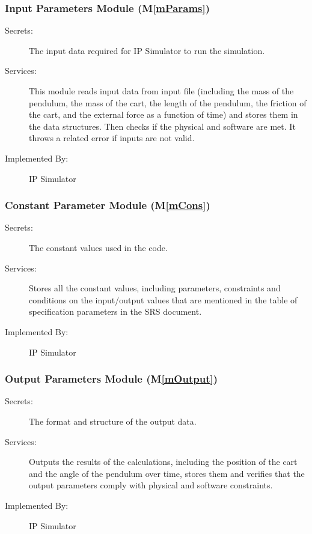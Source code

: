 \documentclass[12pt, titlepage]{article}
\newcommand{\mref}[1]{M\ref{#1}}
\begin{document}
\subsubsection{Input Parameters Module (\mref{mParams})}

\begin{description}
\item[Secrets:] The input data required for IP Simulator to run the simulation.

\item[Services:]This module reads input data from input file (including the mass of the pendulum, the mass of the cart, the length of the pendulum, the friction of the cart, and the external force as a function of time) and stores them in the data structures. Then checks if the physical and software are met. It throws a related error if inputs are not valid.
\item[Implemented By:] IP Simulator
\end{description}


\subsubsection{Constant Parameter Module (\mref{mCons})}
\begin{description}
\item[Secrets:] The constant values used in the code.
\item[Services:] Stores all the constant values, including parameters, constraints and conditions on the input/output values that are mentioned in the table of specification parameters in the SRS document.

\item[Implemented By:] IP Simulator
\end{description} 
\subsubsection{Output Parameters Module (\mref{mOutput})}

\begin{description}
\item[Secrets:] The format and structure of the output data.
\item[Services:] Outputs the results of the calculations, including the position of the cart and the angle of the pendulum over time, stores them and verifies that the output parameters comply with physical and software constraints.
\item[Implemented By:] IP Simulator
\end{description} 
\end{document}
